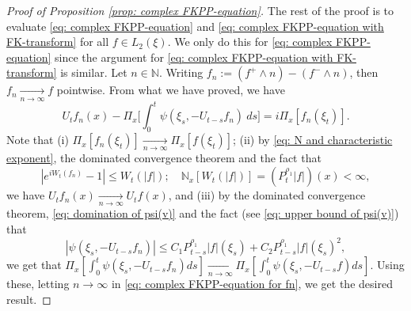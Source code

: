 \documentclass[EJP]{ejpecp} %
\begin{document}
\begin{proof}[Proof of Proposition \ref{prop: complex FKPP-equation}]
  	The rest of the proof is to evaluate \eqref{eq: complex FKPP-equation} and \eqref{eq: complex FKPP-equation with FK-transform} for all $f\in L_2(\xi)$. We only do this for \eqref{eq: complex FKPP-equation} since the argument for \eqref{eq: complex FKPP-equation with FK-transform} is similar.
  	Let $n \in \mathbb N$.
  	Writing $f_n := (f^+ \wedge n) - (f^- \wedge n)$, then $f_n \xrightarrow[n\to \infty]{} f$ pointwise.
  	From what we have proved, we have
\begin{equation}
\label{eq: complex FKPP-equation for fn}
    U_tf_n(x) - \Pi_{x} \Big[\int_0^t \psi (\xi_s, - U_{t-s}f_n ) ~ds\Big]
    = i \Pi_{x} [f_n(\xi_t)].
\end{equation}
	Note that
  	(i) $\Pi_{x}[f_n(\xi_t)] \xrightarrow[n\to \infty]{} \Pi_{x}[f(\xi_t)]$;
  	(ii) by \eqref{eq: N and characteristic exponent}, the dominated convergence theorem and the fact that
\[
     |e^{i W_t(f_n)} - 1| \leq W_t(|f|);
    \quad \mathbb N_x[W_t(|f|)] = (P_t^{\rho_1} |f|)(x)
    < \infty,
\]
  	we have $U_tf_n(x) \xrightarrow[n\to \infty]{} U_tf(x)$, and (iii) by the dominated convergence theorem, \eqref{eq: domination of psi(v)} and the fact (see \eqref{eq: upper bound of psi(v)}) that
\[
    |\psi(\xi_s,- U_{t-s}f_n) |
    \leq C_1 P_{t-s}^{\rho_1}|f|(\xi_s)+C_2 P_{t-s}^{\rho_1}|f|(\xi_s)^2,
\]
  	we get that $\Pi_{x} [\int_0^t \psi(\xi_s,- U_{t-s}f_n)ds] \xrightarrow[n\to \infty]{} \Pi_{x} [\int_0^t \psi(\xi_s,- U_{t-s}f)ds]$.
  	Using these, letting $n \to \infty$ in \eqref{eq: complex FKPP-equation for fn}, we get the desired result.
\end{proof}
\end{document}
